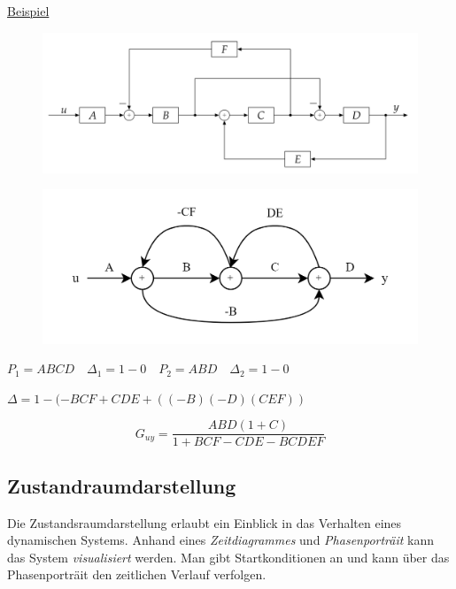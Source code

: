\documentclass[
  10pt,
  a4paper,
  twocolumn]{article}
\numberwithin{equation}{section}
\begin{document}
\ul{Beispiel}

\begin{figure}[H]

{\centering \includegraphics{images/paste-65.png}

}

\end{figure}

\begin{figure}[H]

{\centering \includegraphics{images/paste-66.png}

}

\end{figure}

\(P_1 = ABCD \quad \Delta_1 = 1-0\quad P_2 = ABD \quad \Delta_2=1-0\)

\(\Delta=1-(-BCF+CDE+((-B)(-D)(CEF))\)

\[
G_{uy}=\frac{ABD(1+C)}{1+BCF-CDE-BCDEF}
\]

\hypertarget{zustandraumdarstellung}{%
\subsection{Zustandraumdarstellung}\label{zustandraumdarstellung}}

Die Zustandsraumdarstellung erlaubt ein Einblick in das Verhalten eines
dynamischen Systems. Anhand eines \emph{Zeitdiagrammes} und
\emph{Phasenporträit} kann das System \emph{visualisiert} werden. Man
gibt Startkonditionen an und kann über das Phasenporträit den zeitlichen
Verlauf verfolgen.
\end{document}
